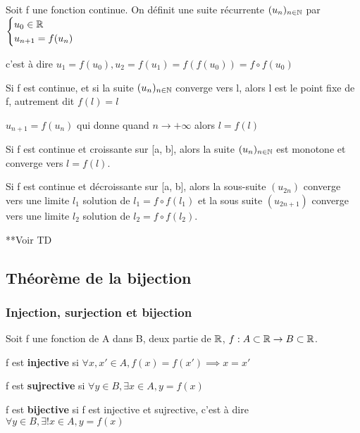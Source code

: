 \documentclass[a4paper, 12pt]{article}
\begin{document}
Soit f une fonction continue. On définit une suite récurrente $(u_n)_{n \in \mathbb{N}}$ par $\begin{cases}u_0 \in \mathbb{R} \\ u_{n+1} = f(u_n)\end{cases}$

c'est à dire $u_1 = f(u_0), u_2 = f(u_1) = f(f(u_0)) = f \circ f(u_0)$

\begin{theorem}
    Si f est continue, et si la suite $(u_n)_{n \in \mathbb{N}}$ converge vers l, alors l est le point fixe de f,
    autrement dit $f(l) = l$
\end{theorem}

\begin{demonstration}
    $u_{n+1} = f(u_n)$ qui donne quand $n \to +\infty$ alors $l = f(l)$
\end{demonstration}

\begin{proprietes}
    \item Si f est continue et croissante sur [a, b], alors la suite $(u_n)_{n \in \mathbb{N}}$ est monotone et converge vers $l = f(l)$.
    \item Si f est continue et décroissante sur [a, b], alors la sous-suite $(u_{2n})$ converge vers une limite $l_1$ solution
    de $l_1 = f \circ f(l_1)$ et la sous suite $(u_{2n + 1})$ converge vers une limite $l_2$ solution de $l_2 = f \circ f(l_2)$.
\end{proprietes}

\begin{demonstration}
    **Voir TD
\end{demonstration}

\subsection{Théorème de la bijection}

\subsubsection{Injection, surjection et bijection}

\begin{definition}
    Soit f une fonction de A dans B, deux partie de $\mathbb{R}$, $f: A \subset \mathbb{R} \rightarrow B \subset \mathbb{R}$.

    \item f est \textbf{injective} si $\forall x, x' \in A, f(x) = f(x') \implies x = x'$
    \item f est \textbf{sujrective} si $\forall y \in B, \exists x \in A, y = f(x)$
    \item f est \textbf{bijective} si f est injective et sujrective, c'est à dire $\forall y \in B, \exists! x \in A, y = f(x)$
\end{definition}
\end{document}

